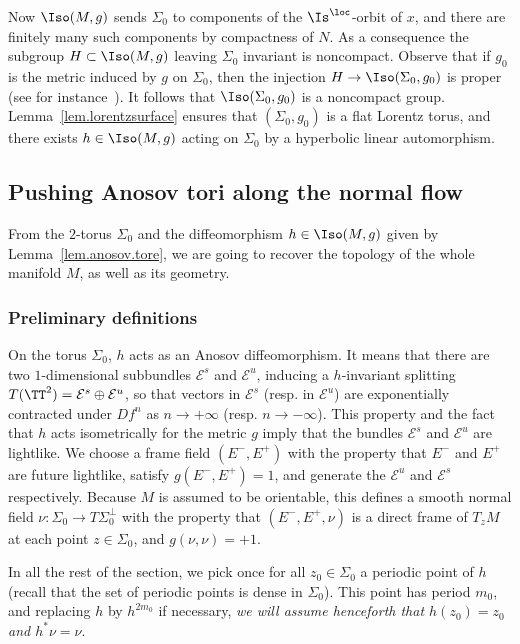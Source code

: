Now $\Iso(M,g)$ sends $\Sigma_0$ to components of the $\Is^{\loc}$-orbit of $x$, and there are finitely many such components by compactness of $N$. As a consequence the subgroup $H \subset \Iso(M,g)$ leaving $\Sigma_0$ invariant is noncompact. Observe that if $g_0$ is the metric induced by $g$ on $\Sigma_0$, then the injection $H \to \Iso(\Sigma_0,g_0)$ is proper (see for instance~\cite[Proposition~3.6]{zeghibflot}). It follows that $\Iso(\Sigma_0,g_0)$ is a noncompact group. Lemma~\ref{lem.lorentzsurface} ensures that $(\Sigma_0,g_0)$ is a flat Lorentz torus, and there exists $h \in \Iso(M,g)$ acting on $\Sigma_0$ by a hyperbolic linear automorphism.



\subsection{Pushing Anosov tori along the normal flow}\label{sec.anosov.mapping}
From the $2$-torus $\Sigma_0$ and the diffeomorphism $h \in \Iso(M,g)$ given by Lemma~\ref{lem.anosov.tore}, we are going to recover the topology of the whole manifold $M$, as well as its geometry.



\subsubsection{Preliminary definitions}\label{sec.push}
On the torus $\Sigma_0$, $h$ acts as an Anosov diffeomorphism. It means that there are two $1$-dimensional subbundles ${\mathcal E}^s$ and ${\mathcal E}^u$, inducing a $h$-invariant splitting $T(\TT^2)={\mathcal E}^s \oplus {\mathcal E}^u$, so that vectors in ${\mathcal E}^s$ (resp. in ${\mathcal E}^u$) are exponentially contracted under $Df^n$ as $n \to + \infty$ (resp. $n \to - \infty$). This property and the fact that $h$ acts isometrically for the metric $g$ imply that the bundles ${\mathcal E}^s$ and ${\mathcal E}^u$ are lightlike. We choose a frame field $(E^-,E^+)$ with the property that $E^-$ and $E^+$ are future lightlike, satisfy $g(E^-,E^+)=1$, and generate the ${\mathcal E}^u$ and ${\mathcal E}^s$ respectively. Because $M$ is assumed to be orientable, this defines a smooth normal field $\nu: \Sigma_0 \to T\Sigma_0^{\perp}$ with the property that $(E^-,E^+,\nu)$ is a direct frame of $T_zM$ at each point $z \in \Sigma_0$, and $g(\nu,\nu)=+1$.



In all the rest of the section, we pick once for all $z_0 \in \Sigma_0$ a periodic point of $h$ (recall that the set of periodic points is dense in $\Sigma_0$). This point has period $m_0$, and replacing $h$ by $h^{2m_0}$ if necessary, \emph{we will assume henceforth that $h(z_0)=z_0$ and $h^* \nu =\nu$}.

